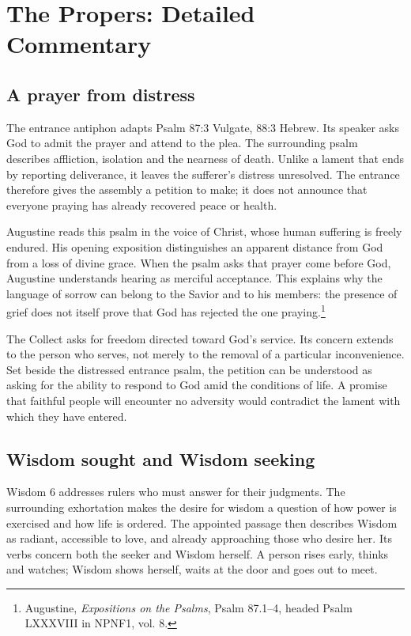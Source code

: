 \section{The Propers: Detailed Commentary}
\subsection{A prayer from distress}
The entrance antiphon adapts Psalm 87:3 Vulgate, 88:3 Hebrew. Its speaker asks God to admit the prayer and attend to the plea. The surrounding psalm describes affliction, isolation and the nearness of death. Unlike a lament that ends by reporting deliverance, it leaves the sufferer's distress unresolved. The entrance therefore gives the assembly a petition to make; it does not announce that everyone praying has already recovered peace or health.

Augustine reads this psalm in the voice of Christ, whose human suffering is freely endured. His opening exposition distinguishes an apparent distance from God from a loss of divine grace. When the psalm asks that prayer come before God, Augustine understands hearing as merciful acceptance. This explains why the language of sorrow can belong to the Savior and to his members: the presence of grief does not itself prove that God has rejected the one praying.\footnote{Augustine, \textit{Expositions on the Psalms}, Psalm 87.1--4, headed Psalm LXXXVIII in NPNF1, vol. 8.}

The Collect asks for freedom directed toward God's service. Its concern extends to the person who serves, not merely to the removal of a particular inconvenience. Set beside the distressed entrance psalm, the petition can be understood as asking for the ability to respond to God amid the conditions of life. A promise that faithful people will encounter no adversity would contradict the lament with which they have entered.

\subsection{Wisdom sought and Wisdom seeking}
Wisdom 6 addresses rulers who must answer for their judgments. The surrounding exhortation makes the desire for wisdom a question of how power is exercised and how life is ordered. The appointed passage then describes Wisdom as radiant, accessible to love, and already approaching those who desire her. Its verbs concern both the seeker and Wisdom herself. A person rises early, thinks and watches; Wisdom shows herself, waits at the door and goes out to meet.

